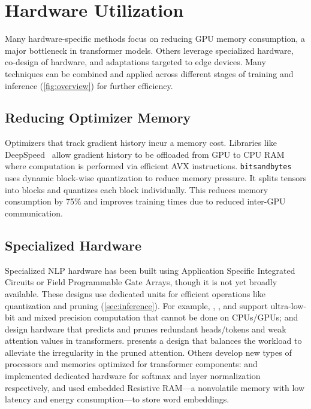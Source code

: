 \section{Hardware Utilization}\label{sec:hardware}

Many hardware-specific methods focus on reducing GPU memory consumption, a major bottleneck in transformer models. Others leverage specialized hardware, co-design of hardware, and adaptations targeted to edge devices. Many techniques can be combined and applied across different stages of training and inference (\ref{fig:overview}) for further efficiency.

\subsection{Reducing Optimizer Memory} 

Optimizers that track gradient history incur a memory cost. Libraries like DeepSpeed~\cite{ren_zero-offload_2021} allow gradient history to be offloaded from GPU to CPU RAM where computation is performed via efficient AVX instructions. 
\texttt{bitsandbytes}~\citep{dettmers2022bit} uses dynamic block-wise quantization to reduce memory pressure. It splits tensors into blocks and quantizes each block individually. This reduces memory consumption by 75\% and improves training times due to reduced inter-GPU communication.

\subsection{Specialized Hardware} \label{sec:spec-hardware}
Specialized NLP hardware has been built using Application Specific Integrated Circuits or Field Programmable Gate Arrays, though it is not yet broadly available. These designs use dedicated units for efficient operations like quantization and pruning (\ref{sec:inference}). 
For example, \citet{zadeh_gobo_2020, zadeh_mokey_2022}, \citet{li_efficient_2021}, and \citet{qu_dota_2022} support ultra-low-bit and mixed precision computation that cannot be done on CPUs/GPUs;
\citet{ham_3_2020,ham_elsa_2021} and \citet{wang_spatten_2021} design hardware that predicts and prunes redundant heads/tokens and weak attention values in transformers. \citet{qu_dota_2022} presents a design that balances the workload to alleviate the irregularity in the pruned attention. Others develop new types of processors and memories optimized for transformer components: 
\citet{lu_hardware_2020} and \citet{liu_hardware_2021} implemented dedicated hardware for softmax and layer normalization respectively, and \citet{tambe_edgebert_2021} used embedded Resistive RAM---a nonvolatile memory with low latency and energy consumption---to store word embeddings. 

